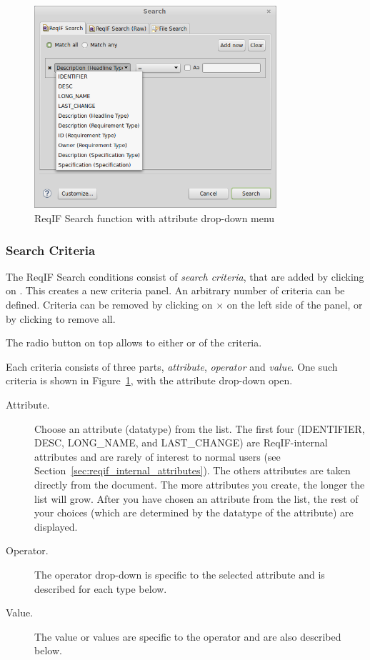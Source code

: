 \begin{figure}
  \centering
  \includegraphics[width=0.8\textwidth]{../rmf-images/reqIF_search_1.png}
  \caption{ReqIF Search function with attribute drop-down menu}
  \label{fig:reqif_search}
\end{figure}
\label{sec:reqif_search}

\subsubsection{Search Criteria}

The ReqIF Search conditions consist of \textit{search criteria}, that are added by clicking on .  This creates a new criteria panel.  An arbitrary number of criteria can be defined.  Criteria can be removed by clicking on $\times$  on the left side of the panel, or by clicking  to remove all.

The radio button on top allows to either  or  of the criteria.

Each criteria consists of three parts, \textit{attribute}, \textit{operator} and \textit{value}.  One such criteria is shown in Figure~\ref{fig:reqif_search}, with the attribute drop-down open.

\begin{description}
\item[Attribute.]  Choose an attribute (datatype) from the list.  The first four (IDENTIFIER, DESC, LONG\_NAME, and LAST\_CHANGE) are ReqIF-internal attributes and are rarely of interest to normal users (see Section~\ref{sec:reqif_internal_attributes}).  The others attributes are taken directly from the document.  The more attributes you create, the longer the list will grow.  After you have chosen an attribute from the list, the rest of your choices (which are determined by the datatype of the attribute) are displayed.
\item[Operator.] The operator drop-down is specific to the selected attribute and is described for each type below.
\item[Value.] The value or values are specific to the operator and are also described below.
\end{description}

